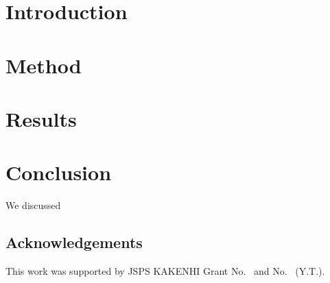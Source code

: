 \documentclass[12pt,a4paper]{article}
\begin{document}
\renewcommand{\thefootnote}{\fnsymbol{footnote}}

\setcounter{page}{1}
\renewcommand{\thefootnote}{\#\arabic{footnote}}
\setcounter{footnote}{0}

\section{Introduction}

\section{Method}
\label{sec:method}

\section{Results}
\label{sec:results}

\section{Conclusion}
\label{sec:conclusion}
We discussed 

\subsection*{Acknowledgements}
This work was supported by JSPS KAKENHI Grant No.~ and
No.~  (Y.T.).

\providecommand{\href}[2]{#2}
\begingroup\raggedright
\begin{thebibliography}{99}

\end{thebibliography}
\endgroup
\end{document}
